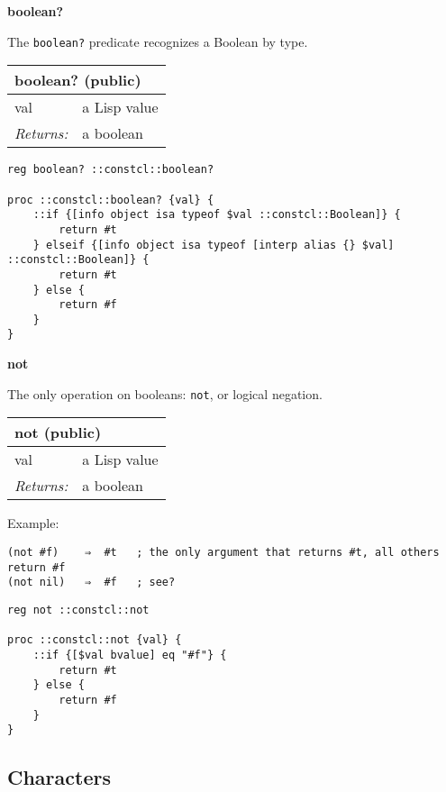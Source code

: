 \documentclass{report}
\begin{document}
\textbf{boolean?}


The \texttt{boolean?} predicate recognizes a Boolean by type.

\begin{tabular}{ |l l| }
\hline
\multicolumn{2}{|l|}{boolean? (public)} \\
\hline
val & a Lisp value \\
\textit{Returns:} & a boolean \\
\hline
\end{tabular}

\noindent\makebox[\linewidth]{\rule{\linewidth}{0.4pt}}
\begin{lstlisting}
reg boolean? ::constcl::boolean?
 
proc ::constcl::boolean? {val} {
    ::if {[info object isa typeof $val ::constcl::Boolean]} {
        return #t
    } elseif {[info object isa typeof [interp alias {} $val] ::constcl::Boolean]} {
        return #t
    } else {
        return #f
    }
}
\end{lstlisting}
\noindent\makebox[\linewidth]{\rule{\linewidth}{0.4pt}}

\textbf{not}


The only operation on booleans: \texttt{not}, or logical negation.

\begin{tabular}{ |l l| }
\hline
\multicolumn{2}{|l|}{not (public)} \\
\hline
val & a Lisp value \\
\textit{Returns:} & a boolean \\
\hline
\end{tabular}


Example:

\noindent\makebox[\linewidth]{\rule{\linewidth}{0.4pt}}
\begin{lstlisting}
(not #f)    ⇒  #t   ; the only argument that returns #t, all others return #f
(not nil)   ⇒  #f   ; see?
\end{lstlisting}
\noindent\makebox[\linewidth]{\rule{\linewidth}{0.4pt}}
\noindent\makebox[\linewidth]{\rule{\linewidth}{0.4pt}}
\begin{lstlisting}
reg not ::constcl::not
 
proc ::constcl::not {val} {
    ::if {[$val bvalue] eq "#f"} {
        return #t
    } else {
        return #f
    }
}
\end{lstlisting}
\noindent\makebox[\linewidth]{\rule{\linewidth}{0.4pt}}
\subsection{Characters}
\label{characters}
\end{document}
